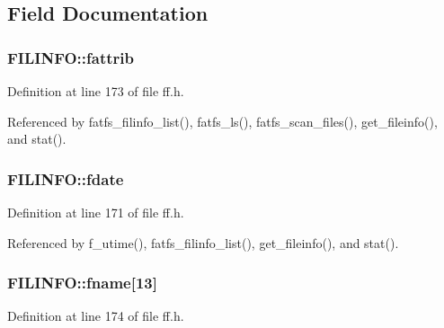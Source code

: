 \subsection{Field Documentation}
\subsubsection[{\texorpdfstring{fattrib}{fattrib}}]{ F\+I\+L\+I\+N\+F\+O\+::fattrib}\hypertarget{structFILINFO_a838d542585831b085537b363f18205c0}{}\label{structFILINFO_a838d542585831b085537b363f18205c0}


Definition at line 173 of file ff.\+h.



Referenced by fatfs\+\_\+filinfo\+\_\+list(), fatfs\+\_\+ls(), fatfs\+\_\+scan\+\_\+files(), get\+\_\+fileinfo(), and stat().

\subsubsection[{\texorpdfstring{fdate}{fdate}}]{ F\+I\+L\+I\+N\+F\+O\+::fdate}\hypertarget{structFILINFO_a7c01c48a15b1b49da459924437b0bd52}{}\label{structFILINFO_a7c01c48a15b1b49da459924437b0bd52}


Definition at line 171 of file ff.\+h.



Referenced by f\+\_\+utime(), fatfs\+\_\+filinfo\+\_\+list(), get\+\_\+fileinfo(), and stat().

\subsubsection[{\texorpdfstring{fname}{fname}}]{ F\+I\+L\+I\+N\+F\+O\+::fname\mbox{[}13\mbox{]}}\hypertarget{structFILINFO_abd852510f2f79b4ec773156d8942dc7c}{}\label{structFILINFO_abd852510f2f79b4ec773156d8942dc7c}


Definition at line 174 of file ff.\+h.



